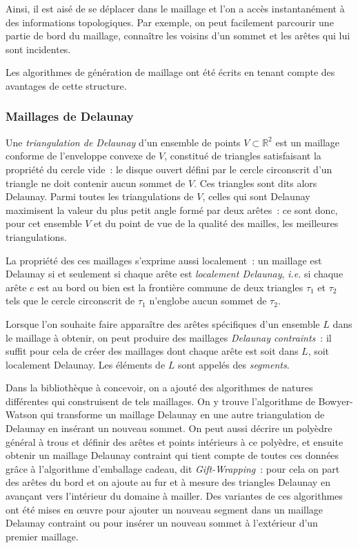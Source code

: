 \documentclass[12pt,a4paper]{report}
\begin{document}
Ainsi, il est aisé de se déplacer dans le maillage et l'on a accès instantanément à des informations topologiques. Par exemple, on peut facilement parcourir une partie de bord du maillage, connaître les voisins d'un sommet et les arêtes qui lui sont incidentes.

Les algorithmes de génération de maillage ont été écrits en tenant compte des avantages de cette structure.

\subsubsection{Maillages de Delaunay}

Une \emph{triangulation de Delaunay} d'un ensemble de points $V\subset\mathbb{R}^2$ est un maillage conforme de l'enveloppe convexe de $V$, constitué de triangles satisfaisant la propriété du cercle vide~: le disque ouvert défini par le cercle circonscrit d'un triangle ne doit contenir aucun sommet de $V$. Ces triangles sont dits alors Delaunay. Parmi toutes les triangulations de $V$, celles qui sont Delaunay maximisent la valeur du plus petit angle formé par deux arêtes~: ce sont donc, pour cet ensemble $V$ et du point de vue de la qualité des mailles, les \og meilleures \fg{} triangulations.

La propriété des ces maillages s'exprime aussi localement~: un maillage est Delaunay si et seulement si chaque arête est \emph{localement Delaunay}, \emph{i.e.} si chaque arête $e$ est au bord ou bien est la frontière commune de deux triangles $\tau_1$ et $\tau_2$ tels que le cercle circonscrit de $\tau_1$ n'englobe aucun sommet de $\tau_2$.

Lorsque l'on souhaite faire apparaître des arêtes spécifiques d'un ensemble $L$ dans le maillage à obtenir, on peut produire des maillages \emph{Delaunay contraints}~: il suffit pour cela de créer des maillages dont chaque arête est soit dans $L$, soit localement Delaunay. Les éléments de $L$ sont appelés des \emph{segments}.

Dans la bibliothèque à concevoir, on a ajouté des algorithmes de natures différentes qui construisent de tels maillages. On y trouve l'algorithme de Bowyer-Watson qui transforme un maillage Delaunay en une autre triangulation de Delaunay en insérant un nouveau sommet. On peut aussi décrire un polyèdre général à trous et définir des arêtes et points intérieurs à ce polyèdre, et ensuite obtenir un maillage Delaunay contraint qui tient compte de toutes ces données grâce à l'algorithme d'emballage cadeau, dit \emph{Gift-Wrapping}~: pour cela on part des arêtes du bord et on ajoute au fur et à mesure des triangles Delaunay en avançant vers l'intérieur du domaine à mailler. Des variantes de ces algorithmes ont été mises en \oe{}uvre pour ajouter un nouveau segment dans un maillage Delaunay contraint ou pour insérer un nouveau sommet à l'extérieur d'un premier maillage.
\end{document}
